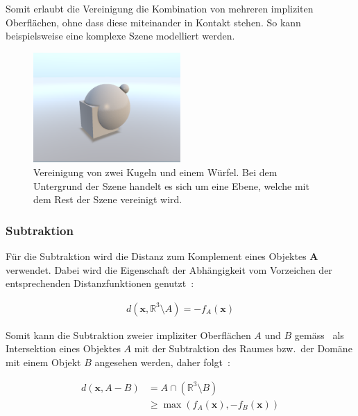 Somit erlaubt die Vereinigung die Kombination von mehreren impliziten
Oberflächen, ohne dass diese miteinander in Kontakt stehen. So kann
beispielsweise eine komplexe Szene modelliert werden.

\begin{figure}[H]
    \centering
    \includegraphics[width=0.5\textwidth]{img/sphere_tracing_union.pdf}
    \caption{Vereinigung von zwei Kugeln und einem Würfel. Bei dem
        Untergrund der Szene handelt es sich um eine Ebene, welche mit dem
        Rest der Szene vereinigt wird.\protect\footnotemark}\label{
        fig:implicit_surfaces_ops_union}
\end{figure}

\subsubsection{Subtraktion}
\label{ssubsec:implicit_surfaces_ops_subtraction}

Für die Subtraktion wird die Distanz zum Komplement eines Objektes
$\bm{A}$ verwendet. Dabei wird die Eigenschaft der Abhängigkeit vom 
Vorzeichen der entsprechenden Distanzfunktionen genutzt~\parencite[S.
532]{hart_sphere_1994}:

\begin{gather}
    d(\bm{x}, \mathbb{R}^{3} \setminus A) = -f_{A}(\bm{x})
\end{gather}

Somit kann die Subtraktion zweier impliziter Oberflächen $A$ und $B$
gemäss~\citeauthor{hart_sphere_1994} als Intersektion eines Objektes $A$ mit der
Subtraktion des Raumes bzw.\ der Domäne mit einem Objekt $B$ angesehen werden,
daher folgt~\parencite[S. 532]{hart_sphere_1994}:

\begin{align}
    d(\bm{x}, A - B) &= A \cap (\mathbb{R}^{3} \setminus B) \\
                     &\geq \max(f_{A}(\bm{x}), -f_{B}(\bm{x}))
\end{align}

